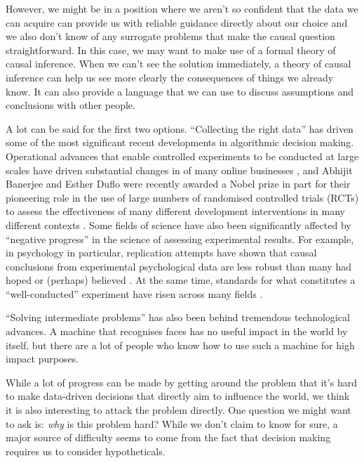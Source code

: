 However, we might be in a position where we aren't so confident that the data we can acquire can provide us with reliable guidance directly about our choice and we also don't know of any surrogate problems that make the causal question straightforward. In this case, we may want to make use of a formal theory of causal inference. When we can't see the solution immediately, a theory of causal inference can help us see more clearly the consequences of things we already know. It can also provide a language that we can use to discuss assumptions and conclusions with other people.

A lot can be said for the first two options. ``Collecting the right data'' has driven some of the most significant recent developments in algorithmic decision making. Operational advances that enable controlled experiments to be conducted at large scales have driven substantial changes in of many online businesses \citep{kohavi_surprising_2017}, and Abhijit Banerjee and Esther Duflo were recently awarded a Nobel prize in part for their pioneering role in the use of large numbers of randomised controlled trials (RCTs) to assess the effectiveness of many different development interventions in many different contexts \citep{zhang_abdul_2014}. Some fields of science have also been significantly affected by ``negative progress'' in the science of assessing experimental results. For example, in psychology in particular, replication attempts have shown that causal conclusions from experimental psychological data are less robust than many had hoped or (perhaps) believed \citep{open_science_collaboration_estimating_2015,stroebe_what_2019}. At the same time, standards for what constitutes a ``well-conducted'' experiment have risen across many fields \citep{nosek_preregistration_2018,liberati_prisma_2009}.

``Solving intermediate problems'' has also been behind tremendous technological advances. A machine that recognises faces has no useful impact in the world by itself, but there are a lot of people who know how to use such a machine for high impact purposes.

While a lot of progress can be made by getting around the problem that it's hard to make data-driven decisions that directly aim to influence the world, we think it is also interesting to attack the problem directly. One question we might want to ask is: \emph{why} is this problem hard? While we don't claim to know for sure, a major source of difficulty seems to come from the fact that decision making requires us to consider hypotheticals.

